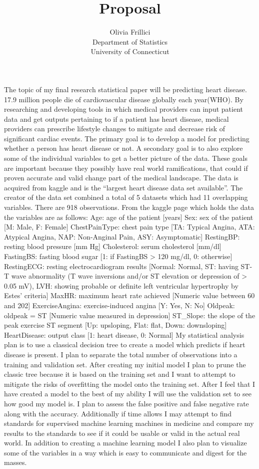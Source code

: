 \documentclass[12pt]{article}
\title{Proposal}
\author{Olivia Frillici\\
  Department of Statistics\\
  University of Connecticut
}
\begin{document}
\maketitle
The topic of my final research statistical paper will be predicting heart disease. 17.9 million people die of cardiovascular disease globally each year(WHO). By researching and developing tools in which medical providers can input patient data and get outputs pertaining to if a patient has heart disease, medical providers can prescribe lifestyle changes to mitigate and decrease risk of significant cardiac events. 
The primary goal is to develop a model for predicting whether a person has heart disease or not. A secondary goal is to also explore some of the individual variables to get a better picture of the data. These goals are important because they possibly have real world ramifications, that could if proven accurate and valid change part of the medical landscape. 
The data is acquired from kaggle and is the “largest heart disease data set available”. The creator of the data set combined a total of 5 datasets which had 11 overlapping variables. There are 918 observations. From the kaggle page which holds the data the variables are as follows: 
Age: age of the patient [years]
Sex: sex of the patient [M: Male, F: Female]
ChestPainType: chest pain type [TA: Typical Angina, ATA: Atypical Angina, NAP: Non-Anginal Pain, ASY: Asymptomatic]
RestingBP: resting blood pressure [mm Hg]
Cholesterol: serum cholesterol [mm/dl]
FastingBS: fasting blood sugar [1: if FastingBS > 120 mg/dl, 0: otherwise]
RestingECG: resting electrocardiogram results [Normal: Normal, ST: having ST-T wave abnormality (T wave inversions and/or ST elevation or depression of > 0.05 mV), LVH: showing probable or definite left ventricular hypertrophy by Estes' criteria]
MaxHR: maximum heart rate achieved [Numeric value between 60 and 202]
ExerciseAngina: exercise-induced angina [Y: Yes, N: No]
Oldpeak: oldpeak = ST [Numeric value measured in depression]
ST\_Slope: the slope of the peak exercise ST segment [Up: upsloping, Flat: flat, Down: downsloping]
HeartDisease: output class [1: heart disease, 0: Normal]
My statistical analysis plan is to use a classical decision tree to create a model which predicts if heart disease is present. I plan to separate the total number of observations into a training and validation set. After creating my initial model I plan to prune the classic tree because it is based on the training set and I want to attempt to mitigate the risks of overfitting the model onto the training set. After I feel that I have created a model to the best of my ability I will use the validation set to see how good my model is. I plan to assess the false positive and false negative rate along with the accuracy. Additionally if time allows I may attempt to find standards for supervised machine learning machines in medicine and compare my results to the standards to see if it could be usable or valid in the actual real world. In addition to creating a machine learning model I also plan to visualize some of the variables in a way which is easy to communicate and digest for the masses. 
\end{document}
